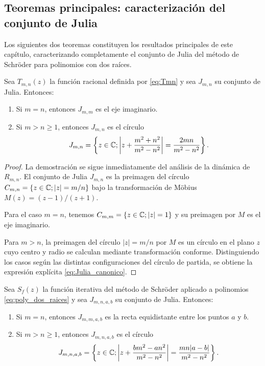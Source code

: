 \subsection{Teoremas principales: caracterización del conjunto de Julia}

Los siguientes dos teoremas constituyen los resultados principales de este capítulo, caracterizando completamente el conjunto de Julia del método de Schröder para polinomios con dos raíces.

\begin{teorema}
\label{teo:julia_canonico}
Sea $T_{m,n}(z)$ la función racional definida por \eqref{eq:Tmn} y sea $J_{m,n}$ su conjunto de Julia. Entonces:
\begin{enumerate}
\item Si $m=n$, entonces $J_{m,m}$ es el eje imaginario.
\item Si $m>n\ge 1$, entonces $J_{m,n}$ es el círculo
\begin{equation}
J_{m,n}=\left\{z\in\mathbb{C}; \left|z+\frac{m^2+n^2}{m^2-n^2}\right|=\frac{2mn}{m^2-n^2}\right\}.
\label{eq:Julia_canonico}
\end{equation}
\end{enumerate}
\end{teorema}

\begin{proof}
La demostración se sigue inmediatamente del análisis de la dinámica de $R_{m,n}$. El conjunto de Julia $J_{m,n}$ es la preimagen del círculo $C_{m,n}=\{z\in\mathbb{C}; |z|=m/n\}$ bajo la transformación de Möbius $M(z)=(z-1)/(z+1)$.

Para el caso $m=n$, tenemos $C_{m,m}=\{z\in\mathbb{C}; |z|=1\}$ y su preimagen por $M$ es el eje imaginario.

Para $m>n$, la preimagen del círculo $|z|=m/n$ por $M$ es un círculo en el plano $z$ cuyo centro y radio se calculan mediante transformación conforme. Distinguiendo los casos según las distintas configuraciones del círculo de partida, se obtiene la expresión explícita \eqref{eq:Julia_canonico}.
\end{proof}

\begin{teorema}
\label{teo:julia_general}
Sea $S_f(z)$ la función iterativa del método de Schröder aplicado a polinomios \eqref{eq:poly_dos_raices} y sea $J_{m,n,a,b}$ su conjunto de Julia. Entonces:
\begin{enumerate}
\item Si $m=n$, entonces $J_{m,m,a,b}$ es la recta equidistante entre los puntos $a$ y $b$.
\item Si $m>n\ge 1$, entonces $J_{m,n,a,b}$ es el círculo
\begin{equation}
J_{m,n,a,b}=\left\{z\in\mathbb{C}; \left|z+\frac{b m^2-a n^2}{m^2-n^2}\right|=\frac{mn |a-b|}{m^2-n^2}\right\}.
\label{eq:Julia_general}
\end{equation}
\end{enumerate}
\end{teorema}

